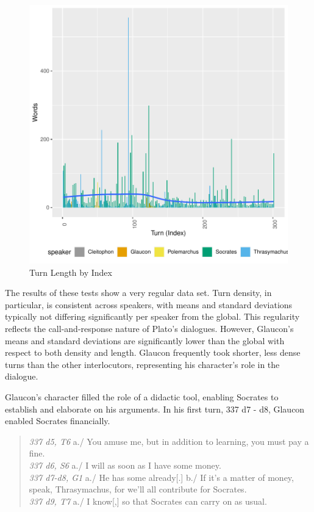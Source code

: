 \documentclass[noraggedright]{turabian-researchpaper}
\begin{document}
\begin{figure}[htbp]
\includegraphics{GreatFlood-Figure: Turn Len}
\caption{Turn Length by Index}
\label{fig:LengthPlot}
\end{figure}

The results of these tests show a very regular data set. Turn density, in particular, is consistent across speakers, with means and standard deviations typically not differing significantly per speaker from the global. This regularity reflects the call-and-response nature of Plato's dialogues. However, Glaucon's means and standard deviations are significantly lower than the global with respect to both density and length. Glaucon frequently took shorter, less dense turns than the other interlocutors, representing his character's role in the dialogue.

Glaucon's character filled the role of a didactic tool, enabling Socrates to establish and elaborate on his arguments. In his first turn, 337 d7 - d8,
Glaucon enabled Socrates financially.

\begin{quote}
\emph{337 d5, T6} a./ You amuse me, but in addition to learning, you must pay a fine.\\
\emph{337 d6, S6} a./ I will as soon as I have some money.\\
\emph{337 d7-d8, G1} a./ He has some already[.] b./ If it's a matter of money, speak, Thrasymachus, for we'll all contribute for Socrates.\\
\emph{337 d9, T7} a./ I know[,] so that Socrates can carry on as usual.
\end{quote}
\end{document}
